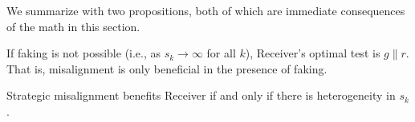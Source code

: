 \noindent
We summarize with two propositions, both of which are immediate consequences of the math in this section.

\begin{proposition}
    If faking is not possible (i.e., as $s_k\to \infty$ for all $k$), Receiver's optimal test is $g \parallel r$. That is, misalignment is only beneficial in the presence of faking.
\end{proposition}

\begin{proposition}
    Strategic misalignment benefits Receiver if and only if there is heterogeneity in $s_k$.
\end{proposition}
